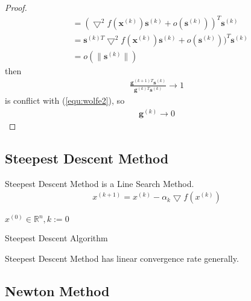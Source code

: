 \begin{proof}
\begin{align}
        &= (\bigtriangledown^2 f(\mathbf{x}^{(k)})\mathbf{s}^{(k)}
        + o(\mathbf{s}^{(k)}))^T \mathbf{s}^{(k)} \\
        &= \mathbf{s}^{(k)T}\bigtriangledown^2 f(\mathbf{x}^{(k)})
        \mathbf{s}^{(k)} + o(\mathbf{s}^{(k)}))^T \mathbf{s}^{(k)} \\
        &= o(\parallel \mathbf{s}^{(k)} \parallel)
    \end{align}
    then
    \begin{align}
        \frac{\mathbf{g}^{(k+1)T} \mathbf{s}^{(k)}}
        {\mathbf{g}^{(k)T} \mathbf{s}^{(k)}}
        \rightarrow 1
    \end{align}
    is conflict with (\ref{equ:wolfe2}), so
    \begin{align}
        \mathbf{g}^{(k)}\rightarrow 0
    \end{align}
\end{proof}



\subsection{Steepest Descent Method}
Steepest Descent Method is a Line Search Method.
\begin{align}
    x^{(k+1)} = x^{(k)} - \alpha_k \bigtriangledown f(x^{(k)})
\end{align}

\begin{algorithm}[H]
    \SetAlgoLined
     $x^{(0)} \in \mathbb{R}^n, k:= 0$\;
     \caption{Steepest Descent Algorithm}
\end{algorithm}
Steepest Descent Method has linear convergence rate generally.

\subsection{Newton Method}

